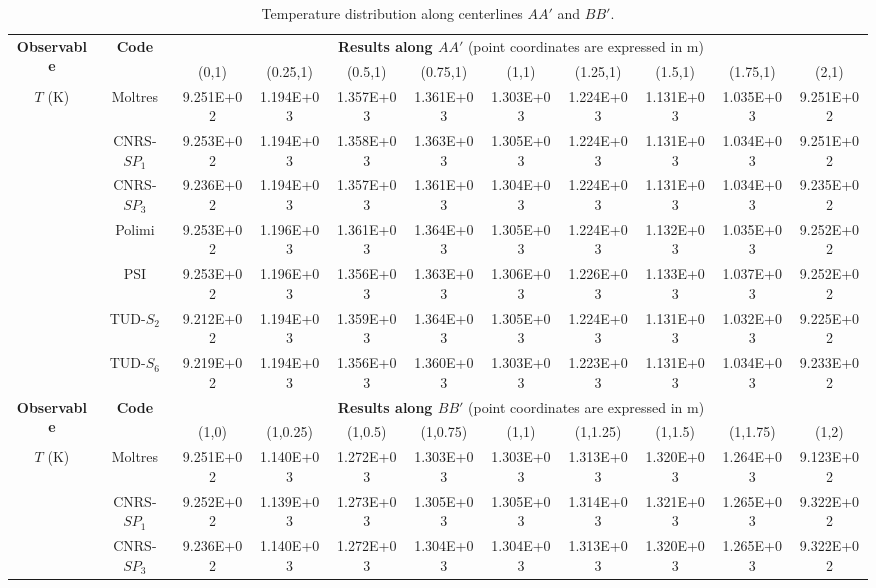 \begin{table*}[htb!]
	\caption{Temperature distribution along centerlines $AA'$ and $BB'$.}
	\centering
	\footnotesize
	\setlength\tabcolsep{1.5pt}
	\begin{tabular}{c c c c c c c c c c c}
		\toprule
		\multirow{2}{*}{\textbf{Observable}} & \multirow{2}{*}{\textbf{Code}} & \multicolumn{9}{c}{\textbf{Results along $AA'$} (point coordinates are expressed in m)} \\
		& & {(0,1)} & {(0.25,1)} & {(0.5,1)} & {(0.75,1)} & {(1,1)} & {(1.25,1)} & {(1.5,1)} & {(1.75,1)} & {(2,1)} \\
		\midrule
		\multirow{7}{*}{$T$ (K)} & Moltres & 9.251E+02 & 1.194E+03 & 1.357E+03 & 1.361E+03 &
		1.303E+03 & 1.224E+03 & 1.131E+03 & 1.035E+03 & 9.251E+02 \\
		& CNRS-$SP_1$ & 9.253E+02 & 1.194E+03 & 1.358E+03 & 1.363E+03 & 1.305E+03 & 1.224E+03 & 1.131E+03 & 1.034E+03 & 9.251E+02 \\
		& CNRS-$SP_3$ & 9.236E+02 & 1.194E+03 & 1.357E+03 & 1.361E+03 & 1.304E+03 & 1.224E+03 & 1.131E+03 & 1.034E+03 & 9.235E+02 \\
		& Polimi & 9.253E+02 & 1.196E+03 & 1.361E+03 & 1.364E+03 & 1.305E+03 & 1.224E+03 & 1.132E+03 & 1.035E+03 & 9.252E+02 \\
		& PSI & 9.253E+02 & 1.196E+03 & 1.356E+03 & 1.363E+03 & 1.306E+03 & 1.226E+03 & 1.133E+03 & 1.037E+03 & 9.252E+02 \\
		& TUD-$S_2$ & 9.212E+02 & 1.194E+03 & 1.359E+03 & 1.364E+03 & 1.305E+03 & 1.224E+03 & 1.131E+03 & 1.032E+03 & 9.225E+02 \\
		& TUD-$S_6$ & 9.219E+02 & 1.194E+03 & 1.356E+03 & 1.360E+03 & 1.303E+03 & 1.223E+03 & 1.131E+03 & 1.034E+03 & 9.233E+02 \\
		\midrule
		\midrule
		\multirow{2}{*}{\textbf{Observable}} & \multirow{2}{*}{\textbf{Code}} & \multicolumn{9}{c}{\textbf{Results along $BB'$} (point coordinates are expressed in m)} \\
		& & {(1,0)} & {(1,0.25)} & {(1,0.5)} & {(1,0.75)} & {(1,1)} & {(1,1.25)} & {(1,1.5)} & {(1,1.75)} & {(1,2)} \\
		\midrule
		\multirow{7}{*}{$T$ (K)} & Moltres & 9.251E+02 & 1.140E+03 & 1.272E+03 & 1.303E+03 &
		1.303E+03 & 1.313E+03 & 1.320E+03 & 1.264E+03 & 9.123E+02 \\
		& CNRS-$SP_1$ & 9.252E+02 & 1.139E+03 & 1.273E+03 & 1.305E+03 & 1.305E+03 & 1.314E+03 & 1.321E+03 & 1.265E+03 & 9.322E+02 \\
		& CNRS-$SP_3$ & 9.236E+02 & 1.140E+03 & 1.272E+03 & 1.304E+03 & 1.304E+03 & 1.313E+03 & 1.320E+03 & 1.265E+03 & 9.322E+02 \\

\end{tabular}
\end{table*}
